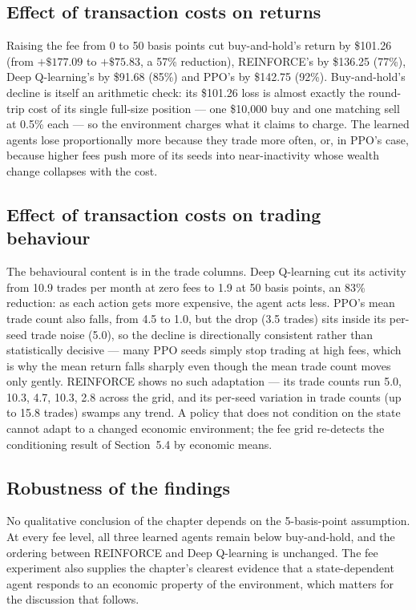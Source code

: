 \subsection{Effect of transaction costs on returns}

Raising the fee from 0 to 50 basis points cut buy-and-hold's return by
\$101.26 (from $+\$177.09$ to $+\$75.83$, a 57\% reduction), REINFORCE's
by \$136.25 (77\%), Deep Q-learning's by \$91.68 (85\%) and PPO's by
\$142.75 (92\%). Buy-and-hold's decline is itself an arithmetic check: its
\$101.26 loss is almost exactly the round-trip cost of its single
full-size position --- one \$10{,}000 buy and one matching sell at 0.5\%
each --- so the environment charges what it claims to charge. The learned
agents lose proportionally more because they trade more often, or, in
PPO's case, because higher fees push more of its seeds into near-inactivity
whose wealth change collapses with the cost.

\subsection{Effect of transaction costs on trading behaviour}

The behavioural content is in the trade columns. Deep Q-learning cut its
activity from 10.9 trades per month at zero fees to 1.9 at 50 basis points,
an 83\% reduction: as each action gets more expensive, the agent acts
less. PPO's mean trade count also falls, from 4.5 to 1.0, but the drop
(3.5 trades) sits inside its per-seed trade noise (5.0), so the decline is
directionally consistent rather than statistically decisive --- many PPO
seeds simply stop trading at high fees, which is why the mean return falls
sharply even though the mean trade count moves only gently. REINFORCE
shows no such adaptation --- its trade counts run 5.0, 10.3, 4.7, 10.3,
2.8 across the grid, and its per-seed variation in trade counts (up to
15.8 trades) swamps any trend. A policy that does not condition on the
state cannot adapt to a changed economic environment; the fee grid
re-detects the conditioning result of Section~5.4 by economic means.

\subsection{Robustness of the findings}

No qualitative conclusion of the chapter depends on the 5-basis-point
assumption. At every fee level, all three learned agents remain below
buy-and-hold, and the ordering between REINFORCE and Deep Q-learning is
unchanged. The fee experiment also supplies the chapter's clearest
evidence that a state-dependent agent responds to an economic property of
the environment, which matters for the discussion that follows.

